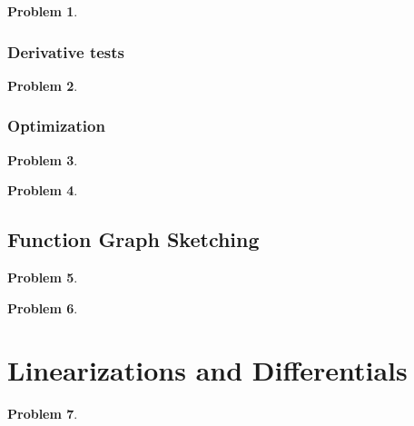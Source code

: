 \documentclass{article}
\newtheorem{problem}{Problem}
\begin{document}
\begin{problem}

\end{problem}

\subsubsection{Derivative tests}
\begin{problem}

\end{problem}

\subsubsection{Optimization}\label{secMPSoptimization}
\begin{problem}

\end{problem}
\begin{problem}

\end{problem}


\subsection{Function Graph Sketching}\label{secMPSfunctionGraphSketching}
\begin{problem}

\end{problem}


\begin{problem}

\end{problem}

\section{Linearizations and Differentials} \label{secMPSLinearizationAndDifferentials}
\begin{problem}

\end{problem}

\end{document}
